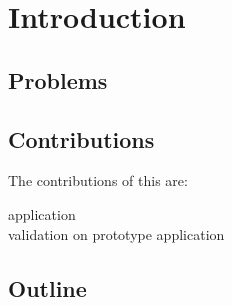
\chapter{Introduction}
\minitoc



\section{Problems}

\section{Contributions}
The contributions of this are:

\begin{description}
	\item[\B]
	\item[\B application \FFI]
	\item[\B validation on prototype application]
\end{description}


\section{Outline}


\\

